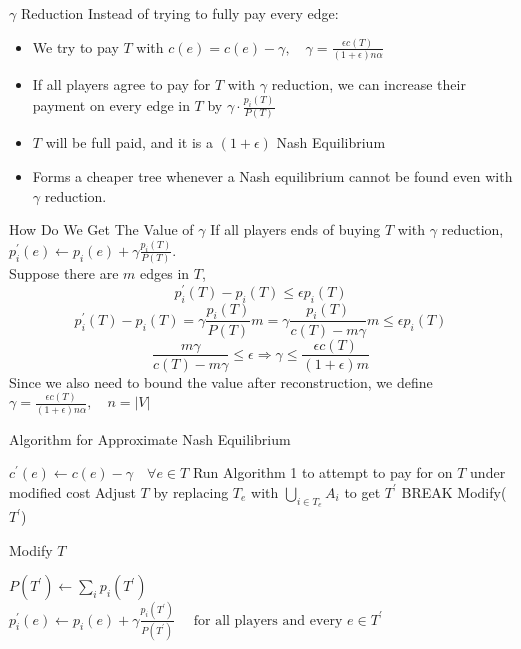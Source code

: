 \documentclass[11pt,aspectratio=169]{beamer}
\begin{document}
\begin{frame}{$\gamma$ Reduction}
    Instead of trying to fully pay every edge: 
    \begin{itemize}
        \item We try to pay $T$ with $c(e) = c(e) - \gamma, \quad \gamma = \frac{\epsilon c(T)}{(1+\epsilon)n\alpha}$
        \item If all players agree to pay for $T$ with $\gamma$ reduction, we can increase their payment on every edge in $T$ by $\gamma \cdot \frac{p_i(T)}{P(T)}$
        \item $T$ will be full paid, and it is a $(1+\epsilon)$ Nash Equilibrium
        \item Forms a cheaper tree whenever a Nash equilibrium cannot be found even with $\gamma$ reduction.
    \end{itemize}
\end{frame}

\begin{frame}{How Do We Get The Value of $\gamma$}
If all players ends of buying  $T$ with $\gamma$ reduction, $p_i^{'}(e) \gets p_i(e) + \gamma\frac{p_i(T)}{P(T)}$.\\
Suppose there are $m$ edges in $T$,
\[p_i^{'}(T) - p_i(T) \leq \epsilon p_i(T)\]
\[p_i^{'}(T) - p_i(T) =  \gamma\frac{p_i(T)}{P(T)}m =  \gamma\frac{p_i(T)}{c(T)-m\gamma}m \leq \epsilon p_i(T)\]
\[ \frac{m\gamma}{c(T)-m\gamma} \leq \epsilon \Rightarrow \gamma \leq \frac{\epsilon c(T)}{(1+\epsilon)m}\]
Since we also need to bound the value after reconstruction, we define $\gamma = \frac{\epsilon c(T)}{(1+\epsilon)n\alpha},\quad n = |V|$
\end{frame}

\begin{frame}{Algorithm for Approximate Nash Equilibrium}
    \begin{algorithm}[H]
        \begin{algorithmic}[2]
            \STATE $c^{'}(e) \gets  c(e) -\gamma \quad \forall e \in T$
            \STATE Run Algorithm 1 to attempt to pay for on $T$ under modified cost
            \STATE  Adjust \( T\) by replacing \(T_e\) with  \(\bigcup_{i\in T_e} A_i\) to get \(T^{'}\)
            \STATE BREAK
            \ENDIF
            \ENDWHILE
            \STATE Modify($T^{'}$)
           
        \end{algorithmic}
        \caption{Modify $T$ }
        \end{algorithm}

        $P(T^{'}) \gets \sum_i p_i(T^{'})$\\
        $p_i^{'}(e) \gets p_i(e) + \gamma\frac{p_i(T^{'})}{P(T^{'})}\quad \text{ for all players and every } e \in T^{'}$
\end{frame}
\end{document}
